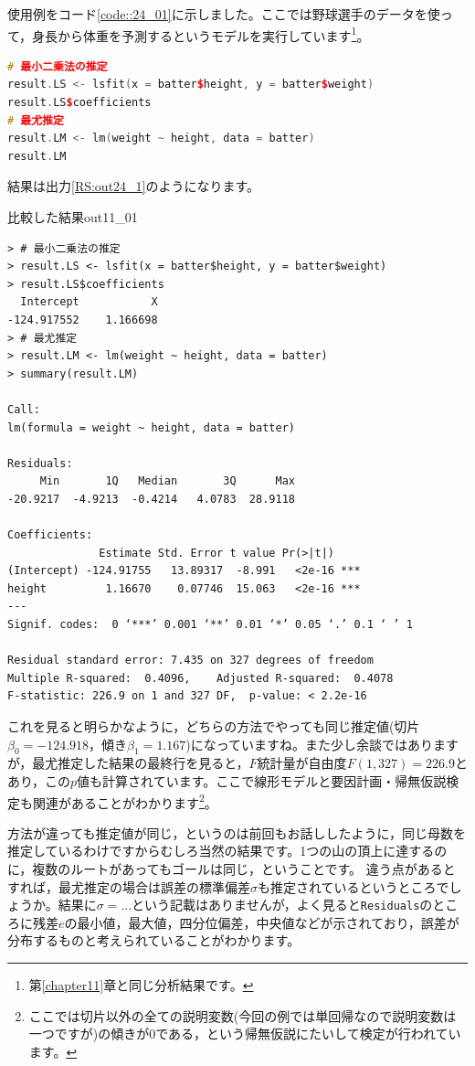 \documentclass{ltjbook}
\begin{document}
使用例をコード\ref{code::24_01}に示しました。ここでは野球選手のデータを使って，身長から体重を予測するというモデルを実行しています\footnote{第\ref{chapter11}章と同じ分析結果です。}。
\begin{lstlisting}[language=c++,label={code::24_01},caption={二つの推定法の比較}]
# 最小二乗法の推定
result.LS <- lsfit(x = batter$height, y = batter$weight)
result.LS$coefficients
# 最尤推定
result.LM <- lm(weight ~ height, data = batter)
result.LM
\end{lstlisting}
結果は出力\ref{RS:out24_1}のようになります。
\begin{Rscreen}{比較した結果}{out11_01}
    \begin{verbatim}
> # 最小二乗法の推定
> result.LS <- lsfit(x = batter$height, y = batter$weight)
> result.LS$coefficients
  Intercept           X 
-124.917552    1.166698 
> # 最尤推定
> result.LM <- lm(weight ~ height, data = batter)
> summary(result.LM)

Call:
lm(formula = weight ~ height, data = batter)

Residuals:
     Min       1Q   Median       3Q      Max 
-20.9217  -4.9213  -0.4214   4.0783  28.9118 

Coefficients:
              Estimate Std. Error t value Pr(>|t|)    
(Intercept) -124.91755   13.89317  -8.991   <2e-16 ***
height         1.16670    0.07746  15.063   <2e-16 ***
---
Signif. codes:  0 ‘***’ 0.001 ‘**’ 0.01 ‘*’ 0.05 ‘.’ 0.1 ‘ ’ 1

Residual standard error: 7.435 on 327 degrees of freedom
Multiple R-squared:  0.4096,	Adjusted R-squared:  0.4078 
F-statistic: 226.9 on 1 and 327 DF,  p-value: < 2.2e-16
    \end{verbatim}
\end{Rscreen}

これを見ると明らかなように，どちらの方法でやっても同じ推定値(切片$\beta_0=-124.918$，傾き$\beta_1=1.167$)になっていますね。また少し余談ではありますが，最尤推定した結果の最終行を見ると，$F$統計量が自由度$F(1,327)=226.9$とあり，この$p$値も計算されています。ここで線形モデルと要因計画・帰無仮説検定も関連があることがわかります\footnote{ここでは切片以外の全ての説明変数(今回の例では単回帰なので説明変数は一つですが)の傾きが0である，という帰無仮説にたいして検定が行われています。}。

方法が違っても推定値が同じ，というのは前回もお話ししたように，同じ母数を推定しているわけですからむしろ当然の結果です。1つの山の頂上に達するのに，複数のルートがあってもゴールは同じ，ということです。
違う点があるとすれば，最尤推定の場合は誤差の標準偏差$\sigma$も推定されているというところでしょうか。結果に$\sigma=...$という記載はありませんが，よく見ると\verb|Residuals|のところに残差$e$の最小値，最大値，四分位偏差，中央値などが示されており，誤差が分布するものと考えられていることがわかります。
\end{document}
